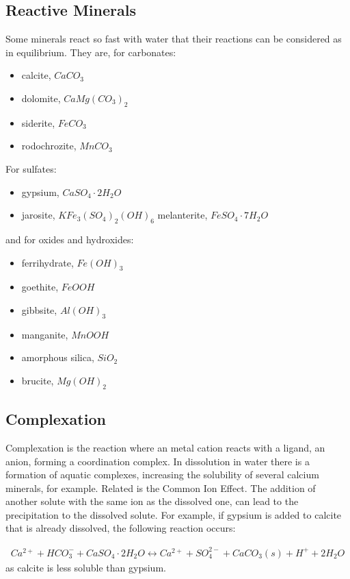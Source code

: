 \documentclass[11pt,twoside]{report}
\begin{document}
\subsection{Reactive Minerals}
Some minerals react so fast with water that their reactions can be considered as in equilibrium. They are, for carbonates:
\begin{itemize}
   \item calcite, $CaCO_{3}$
   \item dolomite, $CaMg(CO_{3})_{2}$
   \item siderite, $FeCO_{3}$
   \item rodochrozite, $MnCO_{3}$
\end{itemize}
For sulfates:
\begin{itemize}
   \item gypsium, $CaSO_{4} \cdot 2H_{2}O$
   \item jarosite, $KFe_{3}(SO_{4})_{2}(OH)_{6}$
   melanterite, $FeSO_{4} \cdot 7H_{2}O$
\end{itemize}
and for oxides and hydroxides:
\begin{itemize}
   \item ferrihydrate, $Fe(OH)_{3}$
   \item goethite, $FeOOH$
   \item gibbsite, $Al(OH)_{3}$
   \item manganite, $MnOOH$
   \item amorphous silica, $SiO_{2}$
   \item brucite, $Mg(OH)_{2}$
\end{itemize}

\subsection{Complexation}
Complexation is the reaction where an metal cation reacts with a ligand, an anion, forming a coordination complex. In dissolution in water there is a formation of aquatic complexes, increasing the solubility of several calcium minerals, for example. Related is the Common Ion Effect. The addition of another solute with the same ion as the dissolved one, can lead to the precipitation to the dissolved solute. For example, if gypsium is added to calcite that is already dissolved, the following reaction occurs:

\begin{align}
   Ca^{2+} + HCO_{3}^{-} + CaSO_{4} \cdot 2H_{2}O \longleftrightarrow Ca^{2+} + SO_{4}^{2-} + CaCO_{3}(s) + H^{+} + 2H_{2}O
\end{align}
as calcite is less soluble than gypsium. 
\end{document}
